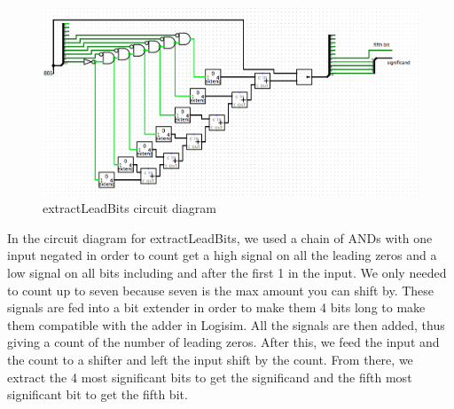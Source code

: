 \documentclass{article}
\begin{document}
\begin{figure}[H]
	\begin{center}
		\includegraphics[width=1\textwidth]{extractLeadingBits.png} 
		\caption{extractLeadBits circuit diagram}
	\end{center}
\end{figure}

In the circuit diagram for extractLeadBits, we used a chain of ANDs with one input negated in order to count get a high signal on all the leading zeros and a low signal on all bits including and after the first 1 in the input. We only needed to count up to seven because seven is the max amount you can shift by. These signals are fed into a bit extender in order to make them 4 bits long to make them compatible with the adder in Logisim. All the signals are then added, thus giving a count of the number of leading zeros. After this, we feed the input and the count to a shifter and left the input shift by the count. From there, we extract the 4 most significant bits to get the significand and the fifth most significant bit to get the fifth bit.
\end{document}
